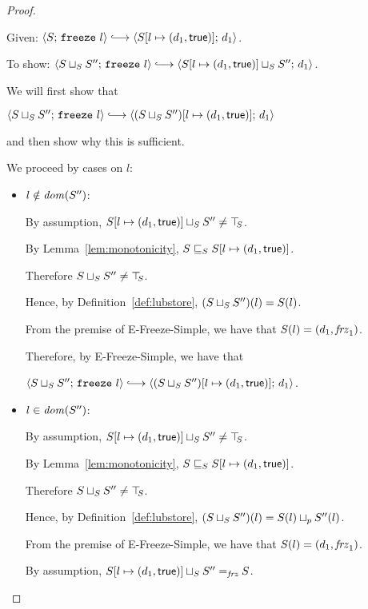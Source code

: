 \begin{proof}
\begin{itemize}
      Given: $\config{S}{\freeze{l}} \parstepsto
      \config{\extS{S}{l}{d_1}{\frozentrue}}{d_1}$.

      To show: $\config{\lubstore{S}{S''}}{\freeze{l}}
      \parstepsto
      \config{\lubstore{\extS{S}{l}{d_1}{\frozentrue}}{S''}}{d_1}$.

      We will first show that

      $\config{\lubstore{S}{S''}}{\freeze{l}} \parstepsto
      \config{\extS{(\lubstore{S}{S''})}{l}{d_1}{\frozentrue}}{d_1}$

      and then show why this is sufficient.

      We proceed by cases on $l$:
      \begin{itemize}
      \item $l \notin \mathit{dom}(S'')$:

        By assumption, $S[l \mapsto (d_1, \textsf{true})] \sqcup_{S} S''
        \neq \top\hspace{-0.85mm}_{S}$.

        By Lemma~\ref{lem:monotonicity},
        $S \sqsubseteq_S S[l \mapsto (d_1, \textsf{true})]$.

        Therefore $S \sqcup_{S} S'' \neq \top\hspace{-0.85mm}_{S}$.

        Hence, by Definition~\ref{def:lubstore},
        $(S \sqcup_{S} S'')(l) = S(l)$.

        From the premise of {\sc E-Freeze-Simple}, we have that
        $S(l) = (d_1, \mathit{frz}_1)$.

        Therefore, by {\sc E-Freeze-Simple}, we have that

        $\config{\lubstore{S}{S''}}{\freeze{l}}
        \parstepsto
        \config{\extS{(\lubstore{S}{S''})}{l}{d_1}{\frozentrue}}{d_1}$.

      \item $l \in \mathit{dom}(S'')$:

        By assumption, $S[l \mapsto (d_1, \textsf{true})] \sqcup_{S} S''
        \neq \top\hspace{-0.85mm}_{S}$.

        By Lemma~\ref{lem:monotonicity},
        $S \sqsubseteq_S S[l \mapsto (d_1, \textsf{true})]$.

        Therefore $S \sqcup_{S} S'' \neq \top\hspace{-0.85mm}_{S}$.

        Hence, by Definition~\ref{def:lubstore},
        $(S \sqcup_{S} S'')(l) = S(l) \sqcup_p S''(l)$.

        From the premise of {\sc E-Freeze-Simple}, we have that
        $S(l) = (d_1, \mathit{frz}_1)$.

        By assumption, $S[l \mapsto (d_1, \textsf{true})] \sqcup_{S} S''
        =_{\textit{frz}} S$.


\end{itemize}
\end{itemize}
\end{proof}
